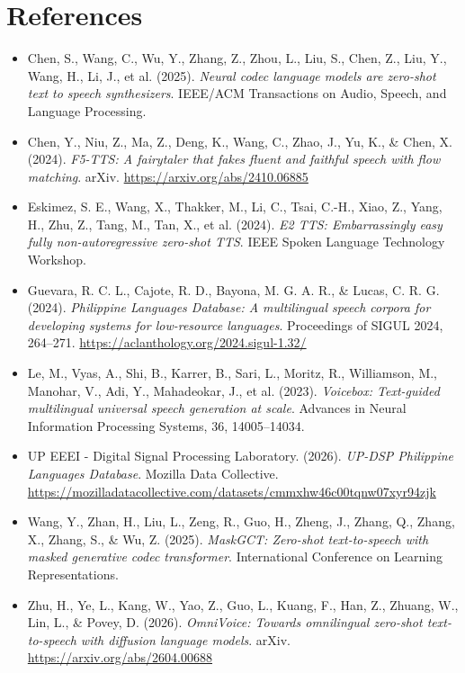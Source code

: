 \documentclass[11pt]{article}
\begin{document}
\section{References}

\begin{itemize}
  \item Chen, S., Wang, C., Wu, Y., Zhang, Z., Zhou, L., Liu, S., Chen, Z., Liu, Y., Wang, H., Li, J., et al. (2025). \textit{Neural codec language models are zero-shot text to speech synthesizers}. IEEE/ACM Transactions on Audio, Speech, and Language Processing.
  \item Chen, Y., Niu, Z., Ma, Z., Deng, K., Wang, C., Zhao, J., Yu, K., \& Chen, X. (2024). \textit{F5-TTS: A fairytaler that fakes fluent and faithful speech with flow matching}. arXiv. \url{https://arxiv.org/abs/2410.06885}
  \item Eskimez, S. E., Wang, X., Thakker, M., Li, C., Tsai, C.-H., Xiao, Z., Yang, H., Zhu, Z., Tang, M., Tan, X., et al. (2024). \textit{E2 TTS: Embarrassingly easy fully non-autoregressive zero-shot TTS}. IEEE Spoken Language Technology Workshop.
  \item Guevara, R. C. L., Cajote, R. D., Bayona, M. G. A. R., \& Lucas, C. R. G. (2024). \textit{Philippine Languages Database: A multilingual speech corpora for developing systems for low-resource languages}. Proceedings of SIGUL 2024, 264--271. \url{https://aclanthology.org/2024.sigul-1.32/}
  \item Le, M., Vyas, A., Shi, B., Karrer, B., Sari, L., Moritz, R., Williamson, M., Manohar, V., Adi, Y., Mahadeokar, J., et al. (2023). \textit{Voicebox: Text-guided multilingual universal speech generation at scale}. Advances in Neural Information Processing Systems, 36, 14005--14034.
  \item UP EEEI - Digital Signal Processing Laboratory. (2026). \textit{UP-DSP Philippine Languages Database}. Mozilla Data Collective. \url{https://mozilladatacollective.com/datasets/cmmxhw46c00tqnw07xyr94zjk}
  \item Wang, Y., Zhan, H., Liu, L., Zeng, R., Guo, H., Zheng, J., Zhang, Q., Zhang, X., Zhang, S., \& Wu, Z. (2025). \textit{MaskGCT: Zero-shot text-to-speech with masked generative codec transformer}. International Conference on Learning Representations.
  \item Zhu, H., Ye, L., Kang, W., Yao, Z., Guo, L., Kuang, F., Han, Z., Zhuang, W., Lin, L., \& Povey, D. (2026). \textit{OmniVoice: Towards omnilingual zero-shot text-to-speech with diffusion language models}. arXiv. \url{https://arxiv.org/abs/2604.00688}
\end{itemize}
\end{document}
